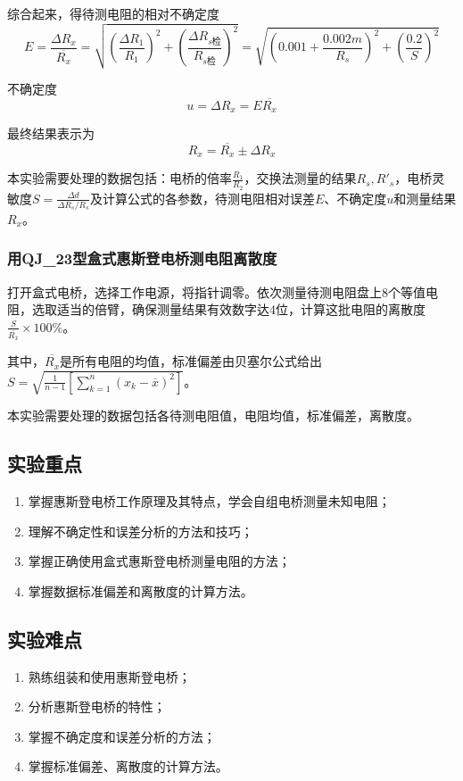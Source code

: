 \documentclass[]{../template/Report}%
\begin{document}
综合起来，得待测电阻的相对不确定度
\[E = \frac{\Delta R_x}{\overline{R_x}} = \sqrt{ \left(\frac{\Delta R_1}{R_1}\right)^2 + \left(\frac{\Delta R_{s\text{检}}}{R_{s\text{检}}}\right)^2} = \sqrt{\left(0.001+ \frac{0.002m}{R_s}\right)^2 + \left(\frac{0.2}{S}\right)^2}\]

不确定度
\[u = \Delta R_x = E \overline{R_x}\]

最终结果表示为
\[R_x = \overline{R_x} \pm \Delta R_x\]

本实验需要处理的数据包括：电桥的倍率$\frac{R_1}{R_2}$，交换法测量的结果$R_s,R'_s$，电桥灵敏度$S = \frac{\Delta d}{\Delta R_s /R_s}$及计算公式的各参数，待测电阻相对误差$E$、不确定度$u$和测量结果$R_x$。
\subsubsection{用QJ\_23型盒式惠斯登电桥测电阻离散度}

打开盒式电桥，选择工作电源，将指针调零。依次测量待测电阻盘上8个等值电阻，选取适当的倍臂，确保测量结果有效数字达4位，计算这批电阻的离散度$\frac{S}{\overline{R_x}} \times 100\%$。

其中，$\overline{R_x}$是所有电阻的均值，标准偏差由贝塞尔公式给出$S = \sqrt{\frac{1}{n-1} \left[\sum_{k=1}^{n}(x_k - \overline{x})^2\right]}$。

本实验需要处理的数据包括各待测电阻值，电阻均值，标准偏差，离散度。


\subsection{实验重点}
\begin{enumerate}
    \item 掌握惠斯登电桥工作原理及其特点，学会自组电桥测量未知电阻；
    \item 理解不确定性和误差分析的方法和技巧；
    \item 掌握正确使用盒式惠斯登电桥测量电阻的方法；
    \item 掌握数据标准偏差和离散度的计算方法。
\end{enumerate}
\subsection{实验难点}
\begin{enumerate}
    \item 熟练组装和使用惠斯登电桥；
    \item 分析惠斯登电桥的特性；
    \item 掌握不确定度和误差分析的方法；
    \item 掌握标准偏差、离散度的计算方法。
\end{enumerate}
\end{document}
